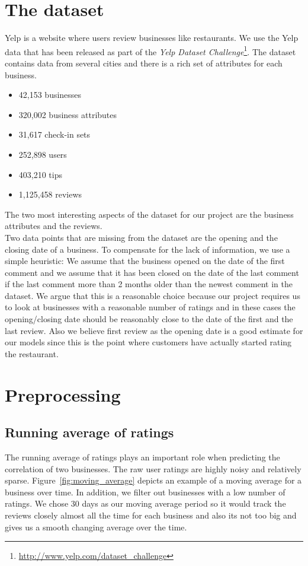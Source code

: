 \documentclass{vldb}
\begin{document}
\section{The dataset}

Yelp is a website where users review businesses like restaurants.
We use the Yelp data that has been released as part of the \textit{Yelp Dataset Challenge}\footnote{\url{http://www.yelp.com/dataset\_challenge}}.
The dataset contains data from several cities and there is a rich set of attributes for each business.

\begin{itemize}
  \item 42,153 businesses
  \item 320,002 business attributes
  \item 31,617 check-in sets
  \item 252,898 users
  \item 403,210 tips
  \item 1,125,458 reviews
\end{itemize}

The two most interesting aspects of the dataset for our project are the business attributes and the reviews.\\
Two data points that are missing from the dataset are the opening and the closing date of a business.
To compensate for the lack of information, we use a simple heuristic: We assume that the business opened on the date of the first comment and we assume that it has been closed on the date of the last comment if the last comment more than 2 months older than the newest comment in the dataset.
We argue that this is a reasonable choice because our project requires us to look at businesses with a reasonable number of ratings and in these cases the opening/closing date should be reasonably close to the date of the first and the last review. Also we believe first review as the opening date is a good estimate for our models since this is the point where customers have actually started rating the restaurant. 

\section{Preprocessing}
\subsection{Running average of ratings}
The running average of ratings plays an important role when predicting the correlation of two businesses.
The raw user ratings are highly noisy and relatively sparse.
Figure~\ref{fig:moving_average} depicts an example of a moving average for a business over time.
In addition, we filter out businesses with a low number of ratings. We chose 30 days as our moving average period so it would track the reviews closely almost all the time for each business and also its not too big and gives us a smooth changing average over the time.
\end{document}
